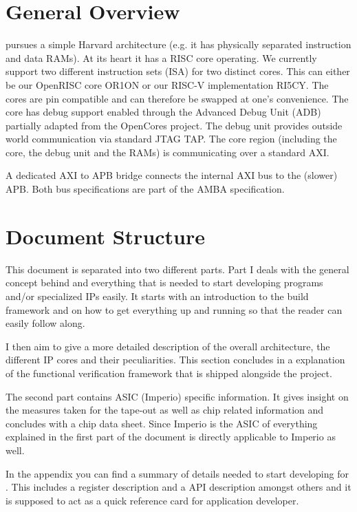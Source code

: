 \section{General Overview}

\pulpino pursues a simple Harvard architecture (e.g. it has physically separated instruction and data RAMs). At its heart it
has a \gls{RISC} core operating. We currently support two different instruction sets (ISA) for two distinct cores. This can either be
our OpenRISC core OR1ON or our RISC-V implementation RI5CY. The cores are pin compatible and can therefore be swapped at one's
convenience.
The core has debug support enabled through the Advanced Debug Unit (ADB) partially adapted from the OpenCores project. The debug
unit provides outside world communication via standard JTAG TAP. The core region (including the core, the debug unit and the RAMs)
is communicating over a standard \gls{AXI}.

A dedicated AXI to APB bridge connects the internal AXI bus to the (slower) \gls{APB}. Both bus specifications are part of the
\gls{AMBA} specification.

\section{Document Structure}

This document is separated into two different parts. Part I deals with the general concept behind \pulpino and
everything that is needed to start developing programs and/or specialized IPs easily. It starts with an introduction to
the build framework and on how to get everything up and running so that the reader can easily follow along.

I then aim to give a more detailed description of the overall architecture, the different IP cores and their peculiarities.
This section concludes in a explanation of the functional verification framework that is shipped alongside the \pulpino project.

The second part contains ASIC (Imperio) specific information. It gives insight on the measures taken for the tape-out as
well as chip related information and concludes with a chip data sheet. Since Imperio is the ASIC of \pulpino everything explained in the
first part of the document is directly applicable to Imperio as well.

In the appendix you can find a summary of details needed to start developing for \pulpino. This includes a register description and
a API description amongst others and it is supposed to act as a quick reference card for application developer.


